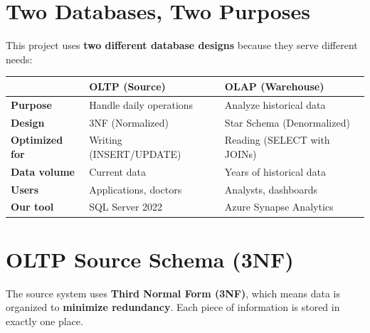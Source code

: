 \documentclass[12pt, a4paper, oneside]{report}
\begin{document}
\section{Two Databases, Two Purposes}

This project uses \textbf{two different database designs} because they serve different needs:

\begin{center}
\begin{tabular}{>{\bfseries}p{3cm} p{5cm} p{5cm}}
    \toprule
    & \textbf{OLTP (Source)} & \textbf{OLAP (Warehouse)} \\
    \midrule
    Purpose & Handle daily operations & Analyze historical data \\
    Design & 3NF (Normalized) & Star Schema (Denormalized) \\
    Optimized for & Writing (INSERT/UPDATE) & Reading (SELECT with JOINs) \\
    Data volume & Current data & Years of historical data \\
    Users & Applications, doctors & Analysts, dashboards \\
    Our tool & SQL Server 2022 & Azure Synapse Analytics \\
    \bottomrule
\end{tabular}
\end{center}

\section{OLTP Source Schema (3NF)}
\label{sec:oltp}

The source system uses \textbf{Third Normal Form (3NF)}, which means data is organized to \textbf{minimize redundancy}. Each piece of information is stored in exactly one place.
\end{document}
